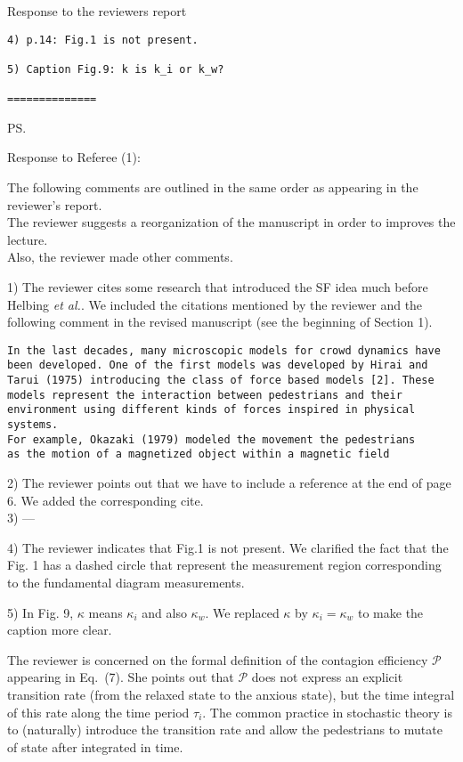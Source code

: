 \documentclass[a4paper,12pt]{letter}
\begin{document}
\begin{letter}{Response to the reviewers report}
\begin{verbatim}
4) p.14: Fig.1 is not present.

5) Caption Fig.9: k is k_i or k_w?

==============
\end{verbatim}


\ps{Response to Referee (1): 

The following comments are outlined in the same order as appearing in the
reviewer’s report. \\

The reviewer suggests a reorganization of the manuscript in order to improves 
the lecture. \\ 

Also, the reviewer made other comments.

1) The reviewer cites some research that introduced the SF idea much before 
Helbing \textit{et al.}. We included the citations mentioned by the reviewer 
and the following comment in the revised manuscript (see the beginning of Section 1). 

\begin{verbatim}
In the last decades, many microscopic models for crowd dynamics have
been developed. One of the first models was developed by Hirai and 
Tarui (1975) introducing the class of force based models [2]. These
models represent the interaction between pedestrians and their 
environment using different kinds of forces inspired in physical systems.
For example, Okazaki (1979) modeled the movement the pedestrians 
as the motion of a magnetized object within a magnetic field
\end{verbatim}

2) The reviewer points out that we have to include a reference at the end of 
page 6. We added the corresponding cite. \\

3) ---

4) The reviewer indicates that Fig.1 is not present. We clarified the fact that the Fig. 1 has a 
dashed circle that represent the measurement region corresponding to the fundamental diagram measurements. 

5) In Fig. 9, $\kappa$ means $\kappa_i$ and also $\kappa_w$. We replaced $\kappa$ by $\kappa_i = \kappa_w$ to make the caption more clear.   

\iffalse
The reviewer is concerned on the formal definition of the contagion 
efficiency $\mathcal{P}$ appearing in Eq.~(7). She points out that 
$\mathcal{P}$ does not express an explicit transition rate (from the relaxed 
state to the anxious state), but the time integral of this rate along the time 
period $\tau_i$. The common practice in stochastic theory is to (naturally) 
introduce the transition rate and allow the pedestrians to mutate of state 
after integrated in time. \\

}
\end{letter}
\end{document}
